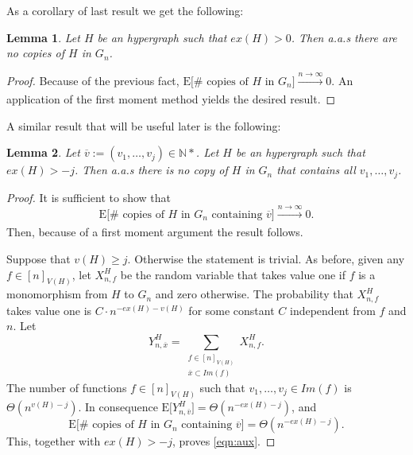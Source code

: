 \documentclass[12pt,notitlepage,a4paper]{article}
\newtheorem{lemma}{Lemma}[section]
\theoremstyle{definition}
\newcommand{\N}{\mathbb{N}}
\begin{document}
As a corollary of last result we get the following:  
\begin{lemma} \label{lem:nocopiesdense}
	Let $H$ be an hypergraph such that $ex(H)>0$. Then
	a.a.s there are no copies of $H$ in $G_n$. 
\end{lemma}  
\begin{proof}
	Because of the previous fact, 
	$\mathrm{E}\big[\# \text{ copies of }H \text{ in } G_n\big] 
	\xrightarrow[]{n\to \infty} 0$. An application of the first moment
	method yields the desired result. 
\end{proof} 

A similar result that will be useful later is the following:

\begin{lemma}\label{lem:nocopiesfixed}
	Let $\overline{v}:=(v_1,\dots,v_j)\in \N*$.
	Let $H$ be an hypergraph such that $ex(H)>-j$. 
	Then a.a.s there is no copy of $H$ in $G_n$ that
	contains all $v_1,\dots,v_j$. 
\end{lemma} 
\begin{proof}
It is sufficient to show that
\begin{equation}\label{eqn:aux}
\mathrm{E}\big[\# \text{ copies of }H \text{ in } G_n \text{ containing }
\overline{v} \big]\xrightarrow[]{n\to \infty} 0.
\end{equation}
Then, because of a first moment argument the result follows.\par
Suppose that $v(H)\geq j$. Otherwise the statement is trivial. 
As before, given any $f\in [n]_{V(H)}$, let $X^H_{n,f}$ be the random
variable that takes value one if $f$ is a monomorphism from $H$ to $G_n$
and zero otherwise. The probability that $X^H_{n,f}$ takes value one is
$C\cdot n^{-ex(H)-v(H)}$ for some constant $C$ independent from $f$ and $n$. 
Let 
\[ Y^H_{n,\overline{x}}= \sum_{\substack{f\in [n]_{V(H)}\\ 
\overline{x}\subset Im(f)}} X^H_{n,f}.\]
The number of functions $f\in [n]_{V(H)}$ such that $v_1,\dots,v_j\in Im(f)$
is $\Theta(n^{v(H)-j})$. In consequence 
$
\mathrm{E}\big[Y^H_{n,\overline{v}}\big]=\Theta(n^{-ex(H)-j})
$, and 
\[\mathrm{E}\big[\# \text{ copies of }H \text{ in } G_n \text{ containing }
\overline{v} \big]=\Theta(n^{-ex(H)-j}).
\]
This, together with $ex(H)>-j$, proves \cref{eqn:aux}. 
\end{proof}
\end{document}
